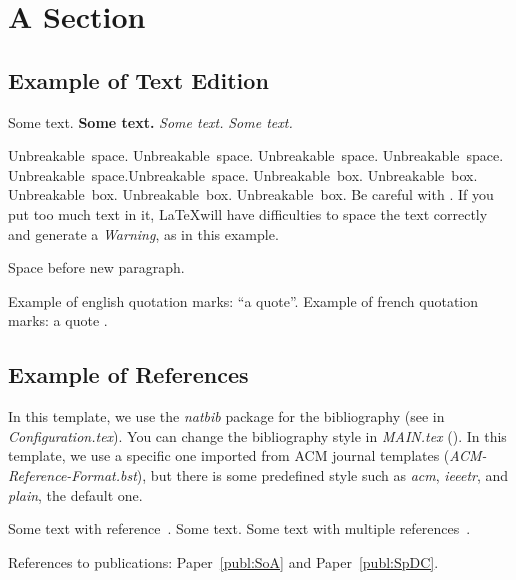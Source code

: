 
\section{A Section}
\label{sec:section_m}

\subsection{Example of Text Edition}

Some text. \textbf{Some text.} \textit{Some text.} \emph{Some text.}  

Unbreakable~space. Unbreakable~space. Unbreakable~space. Unbreakable~space. Unbreakable~space.Unbreakable~space. \mbox{Unbreakable box.} \mbox{Unbreakable box.} \mbox{Unbreakable box.} \mbox{Unbreakable box.} \mbox{Unbreakable box.} Be careful with . If you put too much text in it, \LaTeX will have difficulties to space the text correctly and generate a \emph{Warning}, as in this example.

\bigskip

Space before new paragraph.

\if\Language\EN Example of english quotation marks: ``a quote''.
\else Example of french quotation marks: \og a quote \fg{}. \fi

\subsection{Example of References}

In this template, we use the \emph{natbib} package for the bibliography (see in \textit{Configuration.tex}). You can change the bibliography style in \textit{MAIN.tex} (). In this template, we use a specific one imported from ACM journal templates (\textit{ACM-Reference-Format.bst}), but there is some predefined style such as \textit{acm}, \textit{ieeetr}, and \textit{plain}, the default one.

Some text with reference~\cite{Zhang2021_Gamma}. Some text. Some text with multiple references~\cite{Srikanth2017_SuperStrider, Barrett1994_CSR_BCSR_DIA_ELL, Smith2017_FROSTT, Beamer2017_GAP, JESD235B, Brandt2003, Deveci2018}.

References to publications: Paper~\ref{publ:SoA} and Paper~\ref{publ:SpDC}.